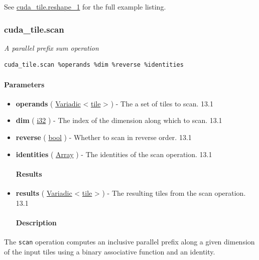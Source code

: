 \documentclass{article}
\begin{document}
See \href{https://docs.nvidia.com/cuda/tile-ir/latest/sections/appendix.html#example-cuda-tile-reshape-1}{cuda\_tile.reshape\_1} for the full example listing.



\subsubsection{cuda\_tile.scan}

\textit{A parallel prefix sum operation}


\begin{lstlisting}
cuda_tile.scan %operands %dim %reverse %identities
\end{lstlisting}

\paragraph{Parameters}

\begin{itemize}
\item \textbf{operands} ( \href{https://docs.nvidia.com/cuda/tile-ir/latest/sections/operations.html#type-variadic}{Variadic} < \href{https://docs.nvidia.com/cuda/tile-ir/latest/sections/types.html#type-tile}{tile} > ) - The a set of tiles to scan. 13.1
\item \textbf{dim} ( \href{https://docs.nvidia.com/cuda/tile-ir/latest/sections/types.html#subsection-element-types}{i32} ) - The index of the dimension along which to scan. 13.1
\item \textbf{reverse} ( \href{https://docs.nvidia.com/cuda/tile-ir/latest/sections/operations.html#type-bool}{bool} ) - Whether to scan in reverse order. 13.1
\item \textbf{identities} ( \href{https://docs.nvidia.com/cuda/tile-ir/latest/sections/operations.html#type-array}{Array} ) - The identities of the scan operation. 13.1


\paragraph{Results}

\item \textbf{results} ( \href{https://docs.nvidia.com/cuda/tile-ir/latest/sections/operations.html#type-variadic}{Variadic} < \href{https://docs.nvidia.com/cuda/tile-ir/latest/sections/types.html#type-tile}{tile} > ) - The resulting tiles from the scan operation. 13.1


\paragraph{Description}

\end{itemize}
The \texttt{scan} operation computes an inclusive parallel prefix along a given dimension of the input tiles using a binary associative function and an identity.
\end{document}
